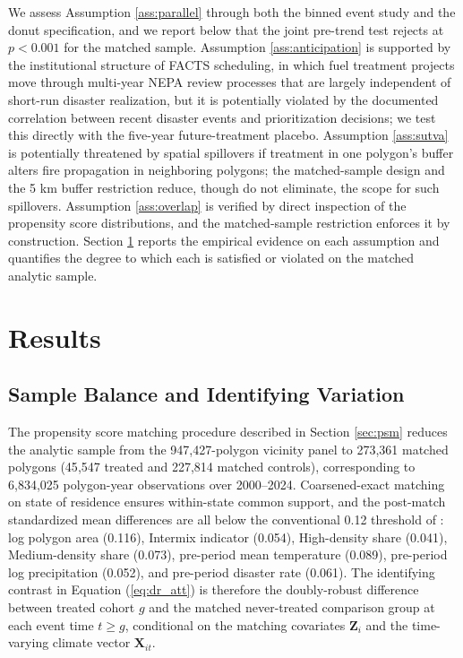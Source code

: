 \documentclass[12pt, letterpaper]{article}
\begin{document}
We assess Assumption \ref{ass:parallel} through both the binned event study and the donut specification, and we report below that the joint pre-trend test rejects at $p < 0.001$ for the matched sample. Assumption \ref{ass:anticipation} is supported by the institutional structure of FACTS scheduling, in which fuel treatment projects move through multi-year NEPA review processes that are largely independent of short-run disaster realization, but it is potentially violated by the documented correlation between recent disaster events and prioritization decisions; we test this directly with the five-year future-treatment placebo. Assumption \ref{ass:sutva} is potentially threatened by spatial spillovers if treatment in one polygon's buffer alters fire propagation in neighboring polygons; the matched-sample design and the 5 km buffer restriction reduce, though do not eliminate, the scope for such spillovers. Assumption \ref{ass:overlap} is verified by direct inspection of the propensity score distributions, and the matched-sample restriction enforces it by construction. Section \ref{sec:results} reports the empirical evidence on each assumption and quantifies the degree to which each is satisfied or violated on the matched analytic sample.


\section{Results}\label{sec:results}

\subsection{Sample Balance and Identifying Variation}

The propensity score matching procedure described in Section \ref{sec:psm} reduces the analytic sample from the 947{,}427-polygon vicinity panel to 273{,}361 matched polygons (45{,}547 treated and 227{,}814 matched controls), corresponding to 6{,}834{,}025 polygon-year observations over 2000--2024. Coarsened-exact matching on state of residence ensures within-state common support, and the post-match standardized mean differences are all below the conventional 0.12 threshold of \citet{rosenbaum1983}: log polygon area (0.116), Intermix indicator (0.054), High-density share (0.041), Medium-density share (0.073), pre-period mean temperature (0.089), pre-period log precipitation (0.052), and pre-period disaster rate (0.061). The identifying contrast in Equation (\ref{eq:dr_att}) is therefore the doubly-robust difference between treated cohort $g$ and the matched never-treated comparison group at each event time $t \geq g$, conditional on the matching covariates $\mathbf{Z}_i$ and the time-varying climate vector $\mathbf{X}_{it}$.
\end{document}
